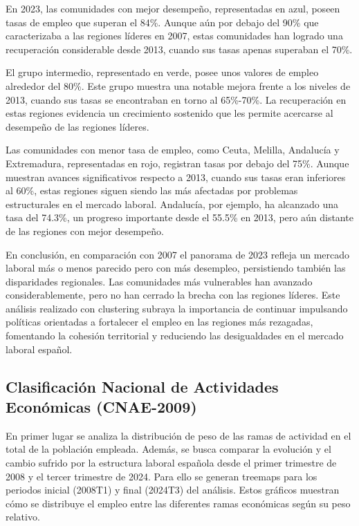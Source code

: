 \documentclass[notspecified,article,submit,moreauthors,pdftex]{Definitions/mdpi}
\begin{document}
En 2023, las comunidades con mejor desempeño, representadas en azul,
poseen tasas de empleo que superan el 84\%. Aunque aún por debajo del
90\% que caracterizaba a las regiones líderes en 2007, estas comunidades
han logrado una recuperación considerable desde 2013, cuando sus tasas
apenas superaban el 70\%.

El grupo intermedio, representado en verde, posee unos valores de empleo
alrededor del 80\%. Este grupo muestra una notable mejora frente a los
niveles de 2013, cuando sus tasas se encontraban en torno al 65\%-70\%.
La recuperación en estas regiones evidencia un crecimiento sostenido que
les permite acercarse al desempeño de las regiones líderes.

Las comunidades con menor tasa de empleo, como Ceuta, Melilla, Andalucía
y Extremadura, representadas en rojo, registran tasas por debajo del
75\%. Aunque muestran avances significativos respecto a 2013, cuando sus
tasas eran inferiores al 60\%, estas regiones siguen siendo las más
afectadas por problemas estructurales en el mercado laboral. Andalucía,
por ejemplo, ha alcanzado una tasa del 74.3\%, un progreso importante
desde el 55.5\% en 2013, pero aún distante de las regiones con mejor
desempeño.

En conclusión, en comparación con 2007 el panorama de 2023 refleja un
mercado laboral más o menos parecido pero con más desempleo,
persistiendo también las disparidades regionales. Las comunidades más
vulnerables han avanzado considerablemente, pero no han cerrado la
brecha con las regiones líderes. Este análisis realizado con clustering
subraya la importancia de continuar impulsando políticas orientadas a
fortalecer el empleo en las regiones más rezagadas, fomentando la
cohesión territorial y reduciendo las desigualdades en el mercado
laboral español.

\subsection{Clasificación Nacional de Actividades Económicas
(CNAE-2009)}\label{clasificaciuxf3n-nacional-de-actividades-econuxf3micas-cnae-2009-1}

En primer lugar se analiza la distribución de peso de las ramas de
actividad en el total de la población empleada. Además, se busca
comparar la evolución y el cambio sufrido por la estructura laboral
española desde el primer trimestre de 2008 y el tercer trimestre de
2024. Para ello se generan treemaps para los periodos inicial (2008T1) y
final (2024T3) del análisis. Estos gráficos muestran cómo se distribuye
el empleo entre las diferentes ramas económicas según su peso relativo.
\end{document}
